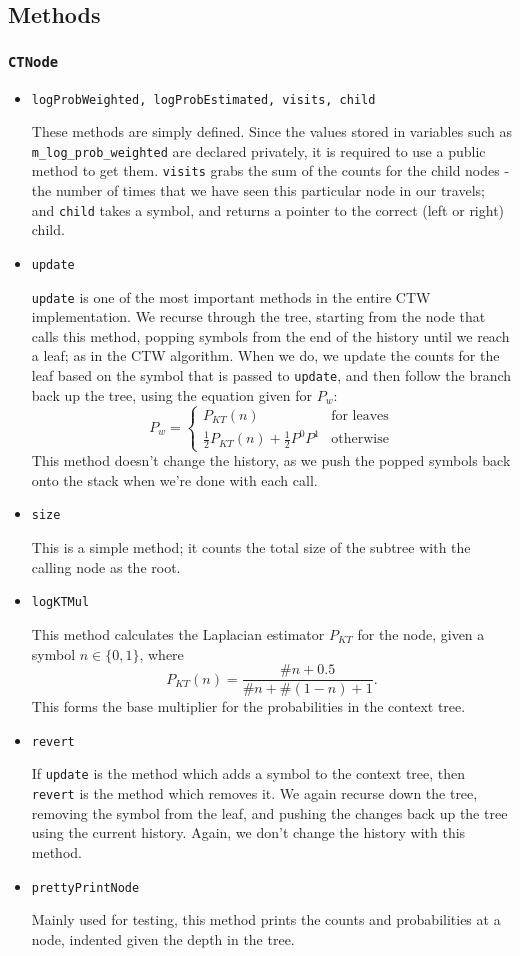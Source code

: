 \documentclass[pdftex,twoside,a4paper]{report}
\begin{document}
\subsection{Methods}
\subsubsection{\texttt{CTNode}}
\begin{itemize}
\item{\texttt{logProbWeighted, logProbEstimated, visits, child}

    These methods are simply defined. Since the values stored in variables such as \texttt{m\_log\_prob\_weighted} are declared privately, it is required to use a public method to get them. \texttt{visits} grabs the sum of the counts for the child nodes - the number of times that we have seen this particular node in our travels; and \texttt{child} takes a symbol, and returns a pointer to the correct (left or right) child.
}
\item{\texttt{update}

    \texttt{update} is one of the most important methods in the entire CTW implementation. We recurse through the tree, starting from the node that calls this method, popping symbols from the end of the history until we reach a leaf; as in the CTW algorithm. When we do, we update the counts for the leaf based on the symbol that is passed to \texttt{update}, and then follow the branch back up the tree, using the equation given for  $P_{w}$: \[ P_{w} = 
     \begin{cases}
    P_{KT}(n) &\text{for leaves}\\
    \frac{1}{2}P_{KT}(n) + \frac{1}{2}P^{0}P^{1} &\text{otherwise}
   \end{cases}  \]
This method doesn't change the history, as we push the popped symbols back onto the stack when we're done with each call.
  }
\item{\texttt{size}
    
    This is a simple method; it counts the total size of the subtree with the calling node as the root. 
  }
\item{\texttt{logKTMul}
    
    This method calculates the Laplacian estimator $P_{KT}$ for the node, given a symbol $n \in \{0,1\}$, where \[ P_{KT}(n) = \frac{\#n + 0.5}{\#n + \#(1-n) + 1}.\] This forms the base multiplier for the probabilities in the context tree.
  }
\item{\texttt{revert}
    
    If \texttt{update} is the method which adds a symbol to the context tree, then \texttt{revert} is the method which removes it. We again recurse down the tree, removing the symbol from the leaf, and pushing the changes back up the tree using the current history. Again, we don't change the history with this method.
  }
\item{\texttt{prettyPrintNode}
    
    Mainly used for testing, this method prints the counts and probabilities at a node, indented given the depth in the tree.
  }
\end{itemize}
\end{document}
